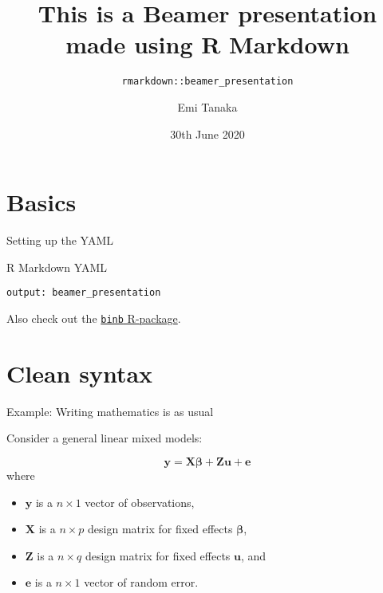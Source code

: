 \documentclass[
  10pt,
  ignorenonframetext,
  aspectratio=169,
]{beamer}
\title{This is a Beamer presentation made using R Markdown}
\subtitle{\texttt{rmarkdown::beamer\_presentation}}
\author{Emi Tanaka}
\date{30th June 2020}
\institute{Monash University}
\providecommand{\tightlist}{%
  \setlength{\itemsep}{0pt}\setlength{\parskip}{0pt}}
\begin{document}
\frame{\titlepage}

\begin{frame}
  \tableofcontents[hideallsubsections]
\end{frame}
\hypertarget{basics}{%
\section{Basics}\label{basics}}

\begin{frame}[fragile]{Setting up the YAML}
\protect\hypertarget{setting-up-the-yaml}{}

\begin{block}{R Markdown YAML}

\texttt{output:\ beamer\_presentation}

\end{block}

Also check out the
\href{https://github.com/eddelbuettel/binb}{\texttt{binb} R-package}.

\end{frame}

\hypertarget{clean-syntax}{%
\section{Clean syntax}\label{clean-syntax}}

\begin{frame}{Example: Writing mathematics is as usual}
\protect\hypertarget{example-writing-mathematics-is-as-usual}{}

Consider a general linear mixed models:

\[\boldsymbol{y} = \mathbf{X}\boldsymbol{\beta} + \mathbf{Z}\boldsymbol{u} + \boldsymbol{e}\]
where

\begin{itemize}
\tightlist
\item
  \(\boldsymbol{y}\) is a \(n\times 1\) vector of observations,
\item
  \(\mathbf{X}\) is a \(n\times p\) design matrix for fixed effects
  \(\boldsymbol{\beta}\),
\item
  \(\mathbf{Z}\) is a \(n\times q\) design matrix for fixed effects
  \(\boldsymbol{u}\), and
\item
  \(\boldsymbol{e}\) is a \(n\times 1\) vector of random error.
\end{itemize}

\end{frame}
\end{document}
